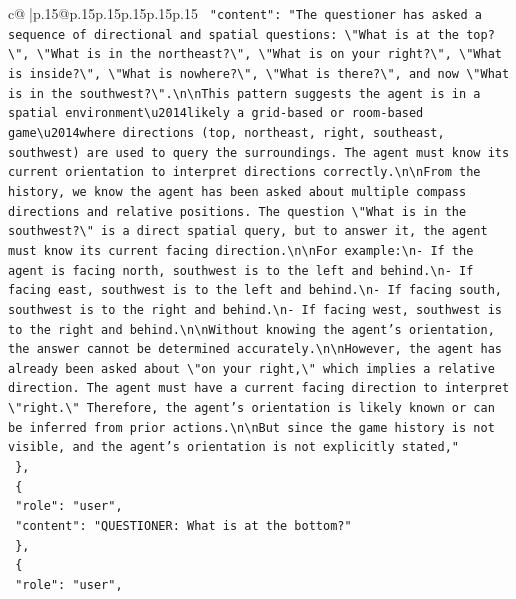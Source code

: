 \documentclass{article}
\begin{document}
{\begin{supertabular}{c@{$\;$}|p{.15\linewidth}@{}p{.15\linewidth}p{.15\linewidth}p{.15\linewidth}p{.15\linewidth}p{.15\linewidth}}
{{{\texttt{    "content": "The questioner has asked a sequence of directional and spatial questions: \textbackslash{}"What is at the top?\textbackslash{}", \textbackslash{}"What is in the northeast?\textbackslash{}", \textbackslash{}"What is on your right?\textbackslash{}", \textbackslash{}"What is inside?\textbackslash{}", \textbackslash{}"What is nowhere?\textbackslash{}", \textbackslash{}"What is there?\textbackslash{}", and now \textbackslash{}"What is in the southwest?\textbackslash{}".\textbackslash{}n\textbackslash{}nThis pattern suggests the agent is in a spatial environment\textbackslash{}u2014likely a grid{-}based or room{-}based game\textbackslash{}u2014where directions (top, northeast, right, southeast, southwest) are used to query the surroundings. The agent must know its current orientation to interpret directions correctly.\textbackslash{}n\textbackslash{}nFrom the history, we know the agent has been asked about multiple compass directions and relative positions. The question \textbackslash{}"What is in the southwest?\textbackslash{}" is a direct spatial query, but to answer it, the agent must know its current facing direction.\textbackslash{}n\textbackslash{}nFor example:\textbackslash{}n{-} If the agent is facing north, southwest is to the left and behind.\textbackslash{}n{-} If facing east, southwest is to the left and behind.\textbackslash{}n{-} If facing south, southwest is to the right and behind.\textbackslash{}n{-} If facing west, southwest is to the right and behind.\textbackslash{}n\textbackslash{}nWithout knowing the agent's orientation, the answer cannot be determined accurately.\textbackslash{}n\textbackslash{}nHowever, the agent has already been asked about \textbackslash{}"on your right,\textbackslash{}" which implies a relative direction. The agent must have a current facing direction to interpret \textbackslash{}"right.\textbackslash{}" Therefore, the agent's orientation is likely known or can be inferred from prior actions.\textbackslash{}n\textbackslash{}nBut since the game history is not visible, and the agent's orientation is not explicitly stated,"} \\
\texttt{  \},} \\
\texttt{  \{} \\
\texttt{    "role": "user",} \\
\texttt{    "content": "QUESTIONER: What is at the bottom?"} \\
\texttt{  \},} \\
\texttt{  \{} \\
\texttt{    "role": "user",} \\
}}}
\end{supertabular}}
\end{document}
